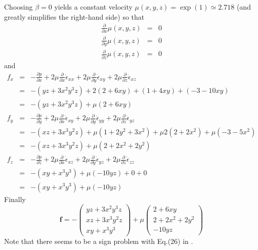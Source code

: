 Choosing $\beta=0$ yields a constant velocity $\mu(x,y,z) = \exp(1) \simeq 2.718$
(and greatly simplifies the right-hand side) so that 
\begin{eqnarray}
\frac{\partial }{\partial x} \mu(x,y,z) &=& 0 \\
\frac{\partial }{\partial y} \mu(x,y,z) &=& 0 \\
\frac{\partial }{\partial z} \mu(x,y,z) &=& 0
\end{eqnarray}
and 
\begin{eqnarray}
f_x 
&=& 
-\frac{\partial p}{\partial x} 
+2\mu\frac{\partial}{\partial x} \dot{\epsilon}_{xx}
+2\mu\frac{\partial}{\partial y} \dot{\epsilon}_{xy}
+2\mu\frac{\partial}{\partial z} \dot{\epsilon}_{xz} \nonumber\\
&=&
-(yz+3x^2y^3z)
+ 2(2 +6xy) + (1+4xy) + (-3 -10xy)   \nonumber\\
&=&
-(yz+3x^2y^3z)
+\mu(2+6xy ) \nonumber\\
f_y 
&=&  
-\frac{\partial p}{\partial y} 
+2\mu\frac{\partial}{\partial x} \dot{\epsilon}_{xy}
+2\mu\frac{\partial}{\partial y} \dot{\epsilon}_{yy}
+2\mu\frac{\partial}{\partial z} \dot{\epsilon}_{yz}  \nonumber\\
&=&
-(xz +3x^3y^2z)
+
\mu(1+2y^2+3x^2)
+\mu2( 2+2x^2 )  
+\mu(-3-5x^2) \nonumber\\
&=&
-(xz +3x^3y^2z)
+ \mu ( 2 + 2x^2 +  2y^2)
\nonumber\\ 
f_z 
&=&
-\frac{\partial p}{\partial z} 
+2\mu\frac{\partial}{\partial x} \dot{\epsilon}_{xz}
+2\mu\frac{\partial}{\partial y} \dot{\epsilon}_{yz}
+2\mu\frac{\partial}{\partial z} \dot{\epsilon}_{zz}  \nonumber\\
&=&
-(xy+x^3y^3) 
+ \mu (-10yz) + 0 + 0 \nonumber\\
&=&
-(xy+x^3y^3) 
+\mu (-10yz) \nonumber
\end{eqnarray}
Finally
\[
{\bm f} = 
-
\left(
\begin{array}{c}
yz+3x^2y^3z\\
xz +3x^3y^2z \\
xy+x^3y^3
\end{array}
\right)
+\mu
\left(
\begin{array}{c}
2+6xy  \\
2 + 2x^2 +  2y^2 \\
-10yz 
\end{array}
\right)
\]
Note that there seems to be a 
sign problem with Eq.(26) in \cite{busa13}.

